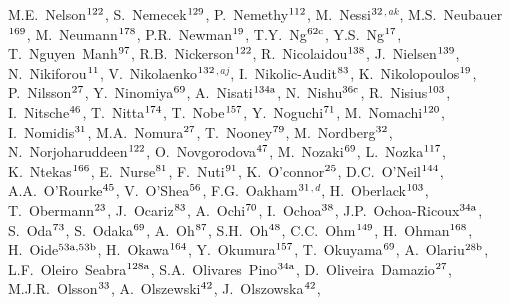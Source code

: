 \begin{flushleft}
M.E.~Nelson$^\textrm{\scriptsize 122}$,
S.~Nemecek$^\textrm{\scriptsize 129}$,
P.~Nemethy$^\textrm{\scriptsize 112}$,
M.~Nessi$^\textrm{\scriptsize 32}$$^{,ak}$,
M.S.~Neubauer$^\textrm{\scriptsize 169}$,
M.~Neumann$^\textrm{\scriptsize 178}$,
P.R.~Newman$^\textrm{\scriptsize 19}$,
T.Y.~Ng$^\textrm{\scriptsize 62c}$,
Y.S.~Ng$^\textrm{\scriptsize 17}$,
T.~Nguyen~Manh$^\textrm{\scriptsize 97}$,
R.B.~Nickerson$^\textrm{\scriptsize 122}$,
R.~Nicolaidou$^\textrm{\scriptsize 138}$,
J.~Nielsen$^\textrm{\scriptsize 139}$,
N.~Nikiforou$^\textrm{\scriptsize 11}$,
V.~Nikolaenko$^\textrm{\scriptsize 132}$$^{,aj}$,
I.~Nikolic-Audit$^\textrm{\scriptsize 83}$,
K.~Nikolopoulos$^\textrm{\scriptsize 19}$,
P.~Nilsson$^\textrm{\scriptsize 27}$,
Y.~Ninomiya$^\textrm{\scriptsize 69}$,
A.~Nisati$^\textrm{\scriptsize 134a}$,
N.~Nishu$^\textrm{\scriptsize 36c}$,
R.~Nisius$^\textrm{\scriptsize 103}$,
I.~Nitsche$^\textrm{\scriptsize 46}$,
T.~Nitta$^\textrm{\scriptsize 174}$,
T.~Nobe$^\textrm{\scriptsize 157}$,
Y.~Noguchi$^\textrm{\scriptsize 71}$,
M.~Nomachi$^\textrm{\scriptsize 120}$,
I.~Nomidis$^\textrm{\scriptsize 31}$,
M.A.~Nomura$^\textrm{\scriptsize 27}$,
T.~Nooney$^\textrm{\scriptsize 79}$,
M.~Nordberg$^\textrm{\scriptsize 32}$,
N.~Norjoharuddeen$^\textrm{\scriptsize 122}$,
O.~Novgorodova$^\textrm{\scriptsize 47}$,
M.~Nozaki$^\textrm{\scriptsize 69}$,
L.~Nozka$^\textrm{\scriptsize 117}$,
K.~Ntekas$^\textrm{\scriptsize 166}$,
E.~Nurse$^\textrm{\scriptsize 81}$,
F.~Nuti$^\textrm{\scriptsize 91}$,
K.~O'connor$^\textrm{\scriptsize 25}$,
D.C.~O'Neil$^\textrm{\scriptsize 144}$,
A.A.~O'Rourke$^\textrm{\scriptsize 45}$,
V.~O'Shea$^\textrm{\scriptsize 56}$,
F.G.~Oakham$^\textrm{\scriptsize 31}$$^{,d}$,
H.~Oberlack$^\textrm{\scriptsize 103}$,
T.~Obermann$^\textrm{\scriptsize 23}$,
J.~Ocariz$^\textrm{\scriptsize 83}$,
A.~Ochi$^\textrm{\scriptsize 70}$,
I.~Ochoa$^\textrm{\scriptsize 38}$,
J.P.~Ochoa-Ricoux$^\textrm{\scriptsize 34a}$,
S.~Oda$^\textrm{\scriptsize 73}$,
S.~Odaka$^\textrm{\scriptsize 69}$,
A.~Oh$^\textrm{\scriptsize 87}$,
S.H.~Oh$^\textrm{\scriptsize 48}$,
C.C.~Ohm$^\textrm{\scriptsize 149}$,
H.~Ohman$^\textrm{\scriptsize 168}$,
H.~Oide$^\textrm{\scriptsize 53a,53b}$,
H.~Okawa$^\textrm{\scriptsize 164}$,
Y.~Okumura$^\textrm{\scriptsize 157}$,
T.~Okuyama$^\textrm{\scriptsize 69}$,
A.~Olariu$^\textrm{\scriptsize 28b}$,
L.F.~Oleiro~Seabra$^\textrm{\scriptsize 128a}$,
S.A.~Olivares~Pino$^\textrm{\scriptsize 34a}$,
D.~Oliveira~Damazio$^\textrm{\scriptsize 27}$,
M.J.R.~Olsson$^\textrm{\scriptsize 33}$,
A.~Olszewski$^\textrm{\scriptsize 42}$,
J.~Olszowska$^\textrm{\scriptsize 42}$,
$$
\end{flushleft}
